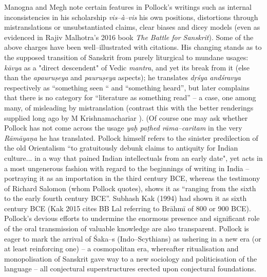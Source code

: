 Manogna and Megh note certain features in Pollock’s writings such as internal inconsistencies in his scholarship \textit{vis–à–vis} his own positions, distortions through mistranslations or unsubstantiated claims, clear biases and dicey models (even as evidenced in Rajiv Malhotra’s 2016 book \textit{The Battle for Sanskrit}). Some of the above charges have been well–illustrated with citations. His changing stands as to the supposed transition of Sanskrit from purely liturgical to mundane usages: \textit{kāvya} as a "direct descendent" of Vedic \textit{mantra}, and yet its break from it (else than the \textit{apauruṣeya} and \textit{pauruṣeya} aspects); he translates \textit{dṛśya andśravya} respectively as “something seen “ and “something heard”, but later complains that there is no category for “literature as something read” – a case, one among many, of misleading by mistranslation (contrast this with the better renderings supplied long ago by M Krishnamachariar ). (Of course one may ask whether Pollock has not come across the usage \textit{yaḥ paṭhed rāma–caritam} in the very \textit{Rāmāyaṇa} he has translated. Pollock himself refers to the sinister predilection of the old Orientalism “to gratuitously debunk claims to antiquity for Indian culture... in a way that pained Indian intellectuals from an early date", yet acts in a most ungenerous fashion with regard to the beginnings of writing in India – portraying it as an importation in the third century BCE, whereas the testimony of Richard Salomon (whom Pollock quotes), shows it as “ranging from the sixth to the early fourth century BCE”. Subhash Kak (1994) had shown it as sixth century BCE (Kak 2015 cites BB Lal referring to Brāhmī of 800 or 900 BCE). Pollock’s devious efforts to undermine the enormous presence and significant role of the oral transmission of valuable knowledge are also transparent. Pollock is eager to mark the arrival of Śaka–s (Indo–Scythians) as ushering in a new era (or at least reinforcing one) – a cosmopolitan era, whereafter ritualisation and monopolisation of Sanskrit gave way to a new sociology and politicisation of the language – all conjectural superstructures erected upon conjectural foundations.

